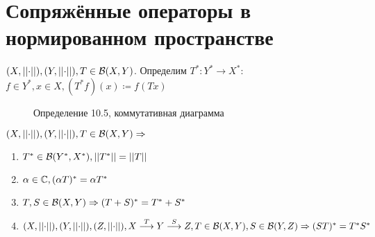 \documentclass[document]{subfiles}
\begin{document}
\section{Сопряжённые операторы в нормированном пространстве}

\begin{definition}
    $(X, \left|\left| {\cdot} \right| \right|), (Y, \left|\left| {\cdot} \right| \right|), T \in \mathcal{B}(X,Y)$. Определим $T^* : Y^* \rightarrow X^*$: $f \in Y^*, x \in X, (T^* f)(x) \coloneqq f(Tx)$
\end{definition}

\begin{figure}
    \centering
    \caption{Определение 10.5, коммутативная диаграмма}
\end{figure}


\begin{theorem}
    $(X, \left|\left| {\cdot} \right| \right|), (Y, \left|\left| {\cdot} \right| \right|), T \in \mathcal{B}(X,Y) \Rightarrow$
    \begin{enumerate}
        \item $T^* \in \mathcal{B}(Y^*, X^*), \left|\left| {T^*} \right| \right| = \left|\left| {T} \right| \right|$
        \item $\alpha \in \mathbb{C}, (\alpha T)^* = \alpha T^*$
        \item $T, S \in \mathcal{B}(X,Y) \Rightarrow (T+S)^* = T^* + S^*$
        \item $(X, \left|\left| {\cdot} \right| \right|), (Y, \left|\left| {\cdot} \right| \right|), (Z, \left|\left| {\cdot} \right| \right|), X \stackrel{T}{\longrightarrow} Y \stackrel{S}{\longrightarrow} Z, T \in \mathcal{B}(X,Y), S \in \mathcal{B}(Y,Z) \Rightarrow 
        (ST)^* = T^* S^* $
    \end{enumerate}
\end{theorem}
\end{document}
